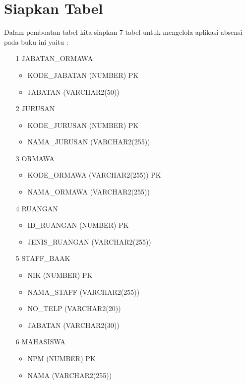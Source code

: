 \section{Siapkan Tabel}
Dalam pembuatan tabel kita siapkan 7 tabel untuk mengelola aplikasi absensi pada buku ini yaitu :
\begin{itemize}
    \item[1]JABATAN\_ORMAWA
            \begin{itemize}
                \item KODE\_JABATAN (NUMBER) PK
                \item JABATAN (VARCHAR2(50))
            \end{itemize}
    \item[2]JURUSAN
            \begin{itemize}
                \item KODE\_JURUSAN (NUMBER) PK
                \item NAMA\_JURUSAN (VARCHAR2(255))
            \end{itemize}
    \item[3]ORMAWA
            \begin{itemize}
                \item KODE\_ORMAWA (VARCHAR2(255)) PK
                \item NAMA\_ORMAWA (VARCHAR2(255))
            \end{itemize}
    \item[4]RUANGAN
            \begin{itemize}
                \item ID\_RUANGAN (NUMBER) PK
                \item JENIS\_RUANGAN (VARCHAR2(255))
            \end{itemize}
    \item[5]STAFF\_BAAK
            \begin{itemize}
                \item NIK (NUMBER) PK
                \item NAMA\_STAFF (VARCHAR2(255))
                \item NO\_TELP (VARCHAR2(20))
                \item JABATAN (VARCHAR2(30))
            \end{itemize}
    \item[6]MAHASISWA
            \begin{itemize}
                \item NPM (NUMBER) PK
                \item NAMA (VARCHAR2(255))

\end{itemize}
\end{itemize}
